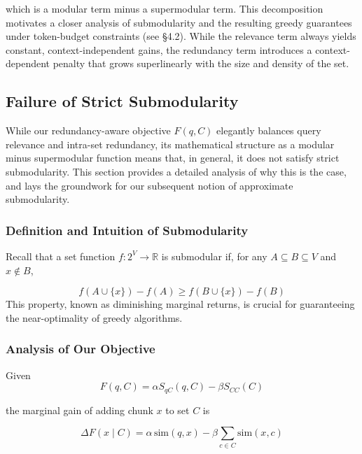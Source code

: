 \documentclass[11pt]{article}
\begin{document}
which is a modular term minus a supermodular term. This decomposition motivates a closer analysis of submodularity and the resulting greedy guarantees under token-budget constraints (see §4.2). While the relevance term always yields constant, context-independent gains, the redundancy term introduces a context-dependent penalty that grows superlinearly with the size and density of the set.

\subsection{Failure of Strict Submodularity}

While our redundancy-aware objective $F(q, C)$ elegantly balances query relevance and intra-set redundancy, its mathematical structure as a modular minus supermodular function means that, in general, it does not satisfy strict submodularity. This section provides a detailed analysis of why this is the case, and lays the groundwork for our subsequent notion of approximate submodularity.

\subsubsection{Definition and Intuition of Submodularity}

Recall that a set function $f: 2^V \to \mathbb{R}$ is submodular if, for any $A \subseteq B \subseteq V$ and $x \notin B$,

\begin{equation}
  \label{eq:example}
  f(A \cup \{x\}) - f(A) \geq f(B \cup \{x\}) - f(B)
\end{equation}
This property, known as diminishing marginal returns, is crucial for guaranteeing the near-optimality of greedy algorithms.

\subsubsection{Analysis of Our Objective}

Given
\begin{equation}
  \label{eq:example}
  F(q, C) = \alpha S_{qC}(q, C) - \beta S_{CC}(C)
\end{equation}

the marginal gain of adding chunk $x$ to set $C$ is

\begin{equation}
  \label{eq:example}
  \Delta F(x \mid C) = \alpha\,\mathrm{sim}(q, x) - \beta \sum_{c \in C} \mathrm{sim}(x, c)
\end{equation}
\end{document}
